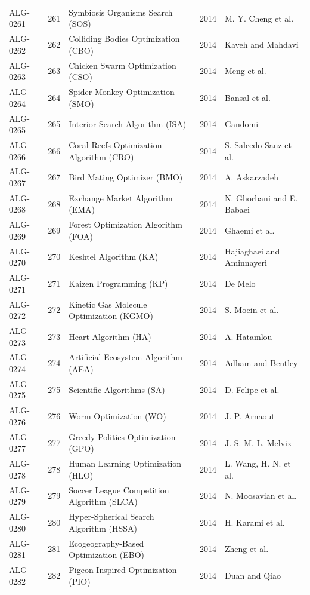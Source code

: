 \documentclass[8pt]{article}
\begin{document}
\begin{landscape}
\begin{longtable}{P{1.7cm}rP{10.0cm}rP{7.2cm}}
ALG-0261 & 261 & Symbiosis Organisms Search (SOS) & 2014 & M. Y. Cheng et al. \\
ALG-0262 & 262 & Colliding Bodies Optimization (CBO) & 2014 & Kaveh and Mahdavi \\
ALG-0263 & 263 & Chicken Swarm Optimization (CSO) & 2014 & Meng et al. \\
ALG-0264 & 264 & Spider Monkey Optimization (SMO) & 2014 & Bansal et al. \\
ALG-0265 & 265 & Interior Search Algorithm (ISA) & 2014 & Gandomi \\
ALG-0266 & 266 & Coral Reefs Optimization Algorithm (CRO) & 2014 & S. Salcedo-Sanz et al. \\
ALG-0267 & 267 & Bird Mating Optimizer (BMO) & 2014 & A. Askarzadeh \\
ALG-0268 & 268 & Exchange Market Algorithm (EMA) & 2014 & N. Ghorbani and E. Babaei \\
ALG-0269 & 269 & Forest Optimization Algorithm (FOA) & 2014 & Ghaemi et al. \\
ALG-0270 & 270 & Keshtel Algorithm (KA) & 2014 & Hajiaghaei and Aminnayeri \\
ALG-0271 & 271 & Kaizen Programming (KP) & 2014 & De Melo \\
ALG-0272 & 272 & Kinetic Gas Molecule Optimization (KGMO) & 2014 & S. Moein et al. \\
ALG-0273 & 273 & Heart Algorithm (HA) & 2014 & A. Hatamlou \\
ALG-0274 & 274 & Artificial Ecosystem Algorithm (AEA) & 2014 & Adham and Bentley \\
ALG-0275 & 275 & Scientific Algorithms (SA) & 2014 & D. Felipe et al. \\
ALG-0276 & 276 & Worm Optimization (WO) & 2014 & J. P. Arnaout \\
ALG-0277 & 277 & Greedy Politics Optimization (GPO) & 2014 & J. S. M. L. Melvix \\
ALG-0278 & 278 & Human Learning Optimization (HLO) & 2014 & L. Wang, H. N. et al. \\
ALG-0279 & 279 & Soccer League Competition Algorithm (SLCA) & 2014 & N. Moosavian et al. \\
ALG-0280 & 280 & Hyper-Spherical Search Algorithm (HSSA) & 2014 & H. Karami et al. \\
ALG-0281 & 281 & Ecogeography-Based Optimization (EBO) & 2014 & Zheng et al. \\
ALG-0282 & 282 & Pigeon-Inspired Optimization (PIO) & 2014 & Duan and Qiao \\

\end{longtable}
\end{landscape}
\end{document}
